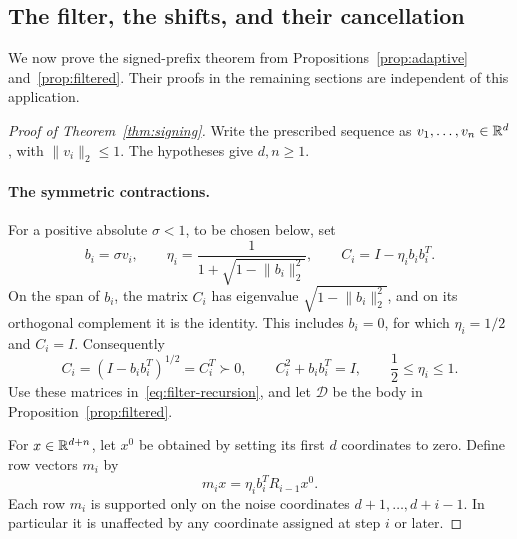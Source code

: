 \subsection{The filter, the shifts, and their cancellation}

We now prove the signed-prefix theorem from
Propositions~\ref{prop:adaptive} and~\ref{prop:filtered}.  Their proofs in the
remaining sections are independent of this application.

\begin{proof}[Proof of Theorem~\ref{thm:signing}]
Write the prescribed sequence as $v_1,\ldots,v_n\in\mathbb R^d$, with
$\lVert v_i\rVert_2\le1$.  The hypotheses give $d,n\ge1$.

\paragraph{The symmetric contractions.}
For a positive absolute $\sigma<1$, to be chosen below, set
\begin{equation}\label{eq:symmetric-filter}
 b_i=\sigma v_i,\qquad
 \eta_i=\frac1{1+\sqrt{1-\lVert b_i\rVert_2^2}},\qquad
 C_i=I-\eta_ib_ib_i^T.
\end{equation}
On the span of $b_i$, the matrix $C_i$ has eigenvalue
$\sqrt{1-\lVert b_i\rVert_2^2}$, and on its orthogonal complement it is the
identity.  This includes $b_i=0$, for which $\eta_i=1/2$ and $C_i=I$.
Consequently
\[
 C_i=(I-b_ib_i^T)^{1/2}=C_i^T\succ0,
 \qquad C_i^2+b_ib_i^T=I,
 \qquad \frac12\le\eta_i\le1.
\]
Use these matrices in~\eqref{eq:filter-recursion}, and let $\mathcal D$ be
the body in Proposition~\ref{prop:filtered}.

For $x\in\mathbb R^{d+n}$, let $x^0$ be obtained by setting its first $d$
coordinates to zero.  Define row vectors $m_i$ by
\begin{equation}\label{eq:predictor-rows}
 m_ix=\eta_i b_i^TR_{i-1}x^0.
\end{equation}
Each row $m_i$ is supported only on the noise coordinates
$d+1,\ldots,d+i-1$.  In particular it is unaffected by any coordinate
assigned at step $i$ or later.


\end{proof}
